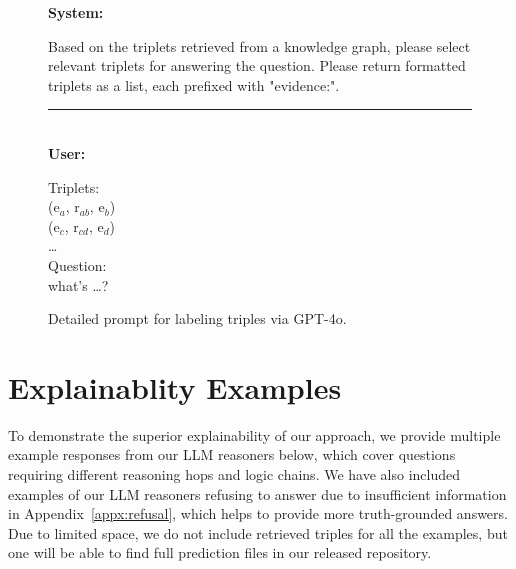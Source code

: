 \begin{figure}
\begin{tcolorbox}[colback=gray!5!white, colframe=gray!75!black, title=Input Prompts for Labeling Relevant Triples via GPT-4o]
\scriptsize

\textbf{System:}\\
\raggedright Based on the triplets retrieved from a knowledge graph, please select relevant triplets for answering the question. Please return formatted triplets as a list, each prefixed with "evidence:".
\rule{\linewidth}{0.4pt} 
\\
\textbf{User:}\; {\color{red}{// Sample to infer}} 

Triplets:\\
(e$_{a}$, r$_{ab}$, e$_b$) \; {\color{red}{// Retrieved triples}} \\
(e$_{c}$, r$_{cd}$, e$_d$)\\
\dots\\
Question:\\
what's \dots? \;  {\color{red}{// Q in datasets}}
\end{tcolorbox}
\caption{Detailed prompt for labeling triples via GPT-4o.}
\label{fig:prompt_gpt4_label}
\end{figure}

\clearpage
\section{Explainablity Examples}\label{appx:explain}

To demonstrate the superior explainability of our approach, we provide multiple example responses from our LLM reasoners below, which cover questions requiring different reasoning hops and logic chains.
We have also included examples of our LLM reasoners refusing to answer due to insufficient information in Appendix~\ref{appx:refusal}, which helps to provide more truth-grounded answers. 
Due to limited space, we do not include retrieved triples for all the examples, but one will be able to find full prediction files in our released repository.


